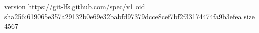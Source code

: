 version https://git-lfs.github.com/spec/v1
oid sha256:619065e357a29132b0e69e32babfd97379dcce8cef7bf2f33174474fa9b3efea
size 4567
